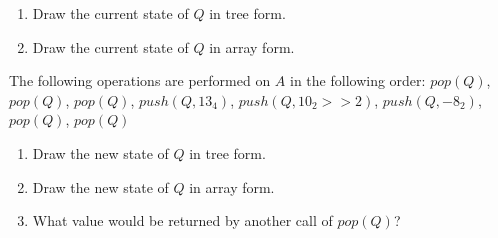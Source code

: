 \documentclass[11pt,addpoints]{exam}
\begin{document}
\begin{questions}




\newpage


\question[1]{}


\newpage


\begin{enumerate}[label=(\Alph*)]
  \item Draw the current state of $Q$ in tree form.


  \item Draw the current state of $Q$ in array form.


\end{enumerate}

The following operations are performed on $A$ in the following order: $pop(Q)$, $pop(Q)$, $pop(Q)$, $push(Q, 13_{4})$, $push(Q, 10_{2} >> 2)$, $push(Q, -8_{2})$, $pop(Q)$, $pop(Q)$ \\

\begin{enumerate}[resume,label=(\Alph*)]
  \item Draw the new state of $Q$ in tree form.


  \item Draw the new state of $Q$ in array form.


  \item What value would be returned by another call of $pop(Q)$?


\end{enumerate}
\end{questions}
\end{document}
